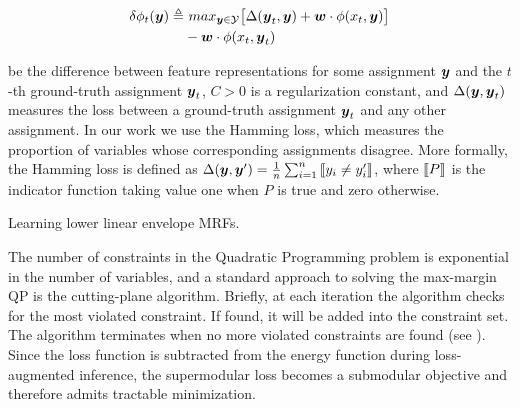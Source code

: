 \begin{align*}
  \delta\phi_t(\by) \triangleq & \text{ }max_{\by\in\Y}\big[\Delta(\by_t,\by)+\bw\cdot\phi(x_t,\by)\big] \\
  & -\bw\cdot\phi(x_t,\by_t)
\end{align*}

\noindent be the difference between feature representations for
some assignment ${\boldsymbol{y}}$ and the $t$-th ground-truth assignment
${\boldsymbol{y}}_t$, $C > 0$ is a regularization constant, and $\Delta({\boldsymbol{y}},
{\boldsymbol{y}}_t)$ measures the loss between a ground-truth assignment
${\boldsymbol{y}}_t$ and any other assignment. In our work we use the Hamming
loss, which measures the proportion of variables whose
corresponding assignments disagree. More formally, the Hamming
loss is defined as $\Delta(\by, \by') = \frac{1}{n}
\sum_{i=1}^{n} \ind{y_i \neq y'_i}$, where $\ind{P}$ is the
indicator function taking value one when $P$ is true and zero
otherwise.

\begin{algorithm}[tb]
  \begin{algorithmic}[1]
    \REPEAT


    \ENDIF
    \ENDFOR
  \end{algorithmic}
  \caption{\label{alg:learning} Learning lower linear envelope MRFs.}
\end{algorithm}

The number of constraints in the Quadratic Programming problem is
exponential in the number of variables, and a standard approach
to solving the max-margin QP is the cutting-plane algorithm.
Briefly, at each iteration the algorithm checks for the most
violated constraint. If found, it will be added into the
constraint set. The algorithm terminates when no more violated
constraints are found (see ). Since the loss
function is subtracted from the energy function during
loss-augmented inference, the supermodular loss becomes a
submodular objective and therefore admits tractable minimization.




